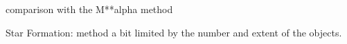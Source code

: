 




comparison with the M**alpha method

Star Formation: method a bit limited by the number and extent of the objects.